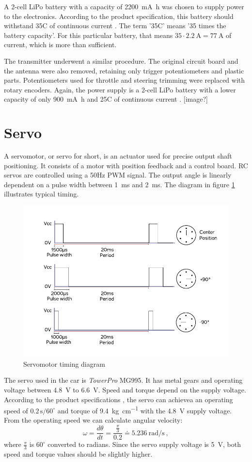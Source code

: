 A 2-cell LiPo battery with a capacity of \SI{2200}{\milli\A\hour} was chosen to supply power to the electronics. According to the product specification, this battery should withstand 35C of continuous current \cite{lipo_car}. The term '35C' means '35 times the battery capacity'. For this particular battery, that means $35 \cdot \SI{2.2}{\A} = \SI{77}{\A}$ of current, which is more than sufficient.

The transmitter underwent a similar procedure. The original circuit board and the antenna were also removed, retaining only trigger potentiometers and plastic parts. Potentiometers used for throttle and steering trimming were replaced with rotary encoders. Again, the power supply is a 2-cell LiPo battery with a lower capacity of only \SI{900}{\milli\A\hour} and 25C of continuous current \cite{lipo_tx}. [\todo image?]



\section{Servo}
\label{sec:hw_servo}
A servomotor, or servo for short, is an actuator used for precise output shaft positioning. It consists of a motor with position feedback and a control board. RC servos are controlled using a 50Hz PWM signal. The output angle is linearly dependent on a pulse width between \SI{1}{\ms} and \SI{2}{\ms}. The diagram in figure \ref{fig:servo_control} illustrates typical timing.
\begin{figure}[ht]
\centering
\includegraphics[width=0.7\linewidth]{fig/Servomotor_Timing_Diagram.pdf}
\caption{Servomotor timing diagram \cite{servo_control}}
\label{fig:servo_control}
\end{figure}

The servo used in the car is \textit{TowerPro} MG995. It has metal gears and operating voltage between \SI{4.8}{\V} to \SI{6.6}{\V}. Speed and torque depend on the supply voltage. According to the product specifications \cite{mg995}, the servo can achievea an operating speed of $0.2\, \text{s}/60^\circ$ and torque of \SI{9.4}{\kg\per\cm} with the \SI{4.8}{\V} supply voltage. From the operating speed we can calculate angular velocity: 
\begin{equation}
\omega = \frac{d \theta}{d t} = \frac{\frac{\pi}{3}}{0.2} \doteq 5.236\ \unit{\radian\per\second}\ ,
\end{equation}
where $\frac{\pi}{3}$ is $60^\circ$ converted to radians.
Since the servo supply voltage is \SI{5}{\V}, both speed and torque values should be slightly higher.


